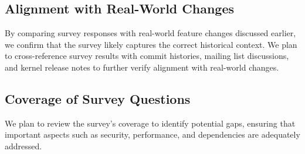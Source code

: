 \subsection{Alignment with Real-World Changes}

By comparing survey responses with real-world feature changes discussed earlier, we confirm that the survey likely captures the correct historical context. We plan to cross-reference survey results with commit histories, mailing list discussions, and kernel release notes to further verify alignment with real-world changes.

\subsection{Coverage of Survey Questions}

We plan to review the survey's coverage to identify potential gaps, ensuring that important aspects such as security, performance, and dependencies are adequately addressed.

% 
% 